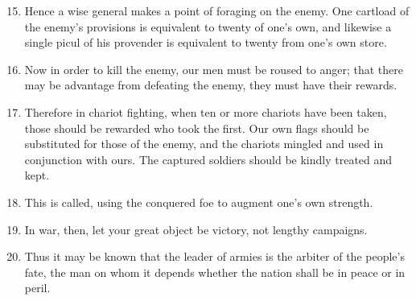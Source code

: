 \documentclass[oneside]{book}
\begin{document}
\begin{enumerate}
	\setcounter{enumi}{14}
	\item Hence a wise general makes a point of foraging on the enemy. One cartload of the enemy's provisions is equivalent to twenty of one's own, and likewise a single picul of his provender is equivalent to twenty from one's own store.
	\item Now in order to kill the enemy, our men must be roused to anger; that there may be advantage from defeating the enemy, they must have their rewards.
	\item Therefore in chariot fighting, when ten or more chariots have been taken, those should be rewarded who took the first. Our own flags should be substituted for those of the enemy, and the chariots mingled and used in conjunction with ours. The captured soldiers should be kindly treated and kept.
	\item This is called, using the conquered foe to augment one's own strength.
	\item In war, then, let your great object be victory, not lengthy campaigns.
	\item Thus it may be known that the leader of armies is the arbiter of the people's fate, the man on whom it depends whether the nation shall be in peace or in peril.
\end{enumerate}
\end{document}
